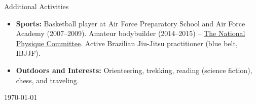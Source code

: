 \documentclass{resume} %
\begin{document}

\begin{rSection}{Additional Activities}
\begin{itemize}
\item \textbf{Sports:} Basketball player at Air Force Preparatory School and Air Force Academy (2007--2009). Amateur bodybuilder (2014--2015) -- \href{https://contests.npcnewsonline.com/contests/2015/npc_northeast_summer_classic/2cdz/joao_dantas}{The National Physique Committee}. Active Brazilian Jiu-Jitsu practitioner (blue belt, IBJJF).
\item \textbf{Outdoors and Interests:} Orienteering, trekking, reading (science fiction), chess, and traveling.
\end{itemize}
\end{rSection}

\today
\end{document}
